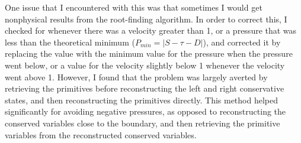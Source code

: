 One issue that I encountered with this was that sometimes I would get nonphysical results from the root-finding algorithm. In order to correct this, I checked for whenever there was a velocity greater than 1, or a pressure that was less than the theoretical minimum ($P_{min}=|S-\tau-D|$\cite{donmez}), and corrected it by replacing the value with the minimum value for the pressure when the pressure went below, or a value for the velocity slightly below 1 whenever the velocity went above 1. However, I found that the problem was largely averted by retrieving the primitives before reconstructing the left and right conservative states, and then reconstructing the primitives directly. This method helped significantly for avoiding negative pressures, as opposed to reconstructing the conserved variables close to the boundary, and then retrieving the primitive variables from the reconstructed conserved variables.


